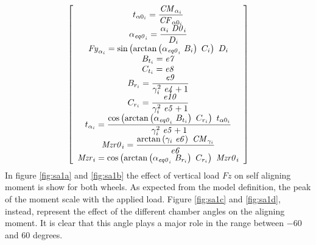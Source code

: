 %
\begin{equation}
    \left[ \begin{array}{c} 
    \displaystyle t_{\alpha0_{i}} =\frac{{\it CM}_{\alpha_{i}}
    }{{\it CF}_{\alpha0_{i}} }\\ \displaystyle \alpha_{{\it eq0}_{i}}
    =\frac{\alpha_{i} ~{\it D0}_{i} }{D_{i} }\\ {\it Fy
   }_{\alpha_{i}} =\sin \left(\arctan \left(\alpha_{{\it eq0}_{i}} ~B_{i}
    \right)~C_{i} \right)~D_{i} \\ B_{t_{i}} ={\it e7} 
   \\ C_{t_{i}} ={\it e8} \\ \displaystyle B_{r_{i}
   } =\frac{{\it e9} }{\gamma_{i} ^{2}~{\it e4} +1}\\ \displaystyle C
   _{r_{i}} =\frac{{\it e10} }{\gamma_{i} ^{2}~{\it e5} +1}
   \\ \displaystyle t_{\alpha_{i}} =\frac{\cos \left(\arctan \left(
   \alpha_{{\it eq0}_{i}} ~B_{t_{i}} \right)~C_{r_{i}} \right)~t_{\alpha0
   _{i}} }{\gamma_{i} ^{2}~{\it e5} +1}\\ \displaystyle {\it Mzr0}_{i
   } =\frac{\arctan \left(\gamma_{i} ~{\it e6} \right)~{\it CM}_{\gamma_{
   i}} }{{\it e6} }\\ {\it Mzr}_{i} =\cos \left(
   \arctan \left(\alpha_{{\it eq0}_{i}} ~B_{r_{i}} \right)~C_{r_{i}} 
   \right)~{\it Mzr0}_{i} 
    \end{array} \right]    
\end{equation}
%
In figure \ref{fig:sa1a} and \ref{fig:sa1b} the effect of vertical load $Fz$ on self aligning moment is show for both wheels. As expected from the model definition, the peak of the moment scale with the applied load. Figure \ref{fig:sa1c} and \ref{fig:sa1d}, instead, represent the effect of the different chamber angles on the aligning moment. It is clear that this angle plays a major role in the range between $-60$ and $60$ degrees. 
%
